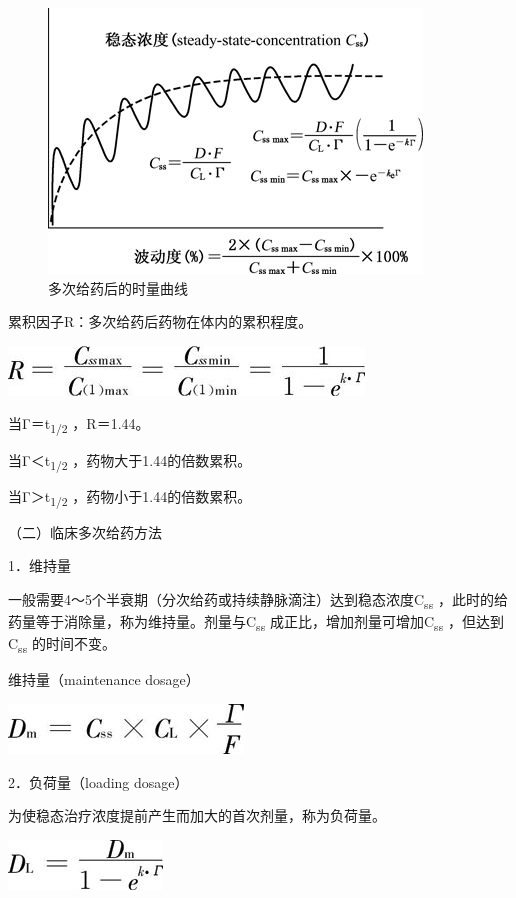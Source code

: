 \begin{figure}[!htbp]
 \centering
 \includegraphics{./images/Image00076.jpg}
 \captionsetup{justification=centering}
 \caption{多次给药后的时量曲线}
 \label{fig3-22}
  \end{figure} 

累积因子R：多次给药后药物在体内的累积程度。

\includegraphics{./images/Image00077.jpg}

当Γ＝t\textsubscript{1/2} ，R＝1.44。

当Γ＜t\textsubscript{1/2} ，药物大于1.44的倍数累积。

当Γ＞t\textsubscript{1/2} ，药物小于1.44的倍数累积。

（二）临床多次给药方法

1．维持量

一般需要4～5个半衰期（分次给药或持续静脉滴注）达到稳态浓度C\textsubscript{ss}
，此时的给药量等于消除量，称为维持量。剂量与C\textsubscript{ss}
成正比，增加剂量可增加C\textsubscript{ss} ，但达到C\textsubscript{ss}
的时间不变。

维持量（maintenance dosage）

\includegraphics{./images/Image00078.jpg}

2．负荷量（loading dosage）

为使稳态治疗浓度提前产生而加大的首次剂量，称为负荷量。

\includegraphics{./images/Image00079.jpg}

